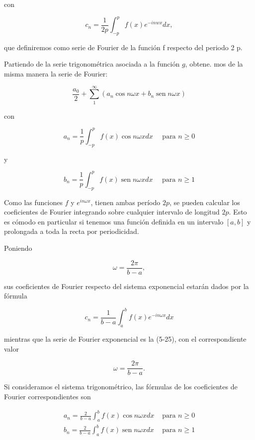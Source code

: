 \documentclass[10pt]{article}
\theoremstyle{plain}
\theoremstyle{definition}
\theoremstyle{remark}
\begin{document}
con


\begin{equation*}
c_{n}=\frac{1}{2 p} \int_{-p}^{p} f(x) e^{-i n w x} d x, \tag{5.26}
\end{equation*}



que definiremos como serie de Fourier de la función f respecto del periodo 2 p.

Partiendo de la serie trigonométrica asociada a la función $g$, obtene. mos de la misma manera la serie de Fourier:


\begin{equation*}
\frac{a_{0}}{2}+\sum_{1}^{\infty}\left(a_{n} \cos n \omega x+b_{n} \operatorname{sen} n \omega x\right) \tag{5-27}
\end{equation*}


con


\begin{equation*}
a_{n}=\frac{1}{p} \int_{-p}^{p} f(x) \cos n \omega x d x \quad \text { para } n \geqslant 0 \tag{5-28}
\end{equation*}


y


\begin{equation*}
b_{n}=\frac{1}{p} \int_{-p}^{p} f(x) \operatorname{sen} n \omega x d x \quad \text { para } n \geqslant 1 \tag{5-29}
\end{equation*}


Como las funciones $f$ y $e^{i n \omega x}$, tienen ambas período $2 p$, se pueden calcular los coeficientes de Fourier integrando sobre cualquier intervalo de longitud $2 p$. Esto es cómodo en particular si tenemos una función definida en un intervalo $[a, b]$ y prolongada a toda la recta por periodicidad.

Poniendo

$$
\omega=\frac{2 \pi}{b-a},
$$

sus coeficientes de Fourier respecto del sistema exponencial estarán dados por la fórmula

$$
c_{n}=\frac{1}{b-a} \int_{a}^{b} f(x) e^{-i n \omega x} d x
$$

mientras que la serie de Fourier exponencial es la (5-25), con el correspondiente valor

$$
\omega=\frac{2 \pi}{b-a} .
$$

Si consideramos el sistema trigonométrico, las fórmulas de los coeficientes de Fourier correspondientes son

$$
\begin{array}{ll}
a_{n}=\frac{2}{b-a} \int_{a}^{b} f(x) \cos n \omega x d x & \text { para } n \geqslant 0 \\
b_{n}=\frac{2}{b-a} \int_{a}^{b} f(x) \operatorname{sen} n \omega x d x & \text { para } n \geqslant 1
\end{array}
$$
\end{document}
